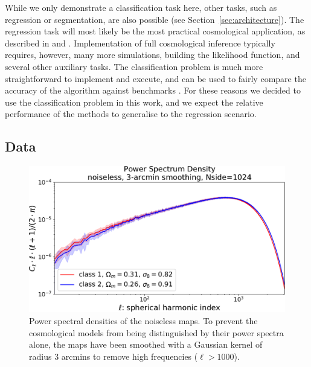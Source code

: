 \documentclass[final,twocolumn,3p,times,sort&compress]{elsarticle}
\newcommand{\secref}[1]{Section~\ref{sec:#1}}
\newcommand{\1}{\b{1}}              %
\newcommand{\0}{\b{0}}              %
\begin{document}
While we only demonstrate a classification task here, other tasks, such as regression or segmentation, are also possible (see \secref{architecture}).
The regression task will most likely be the most practical cosmological application, as described in \citep{gupta2018nongaussianinformation} and \citep{fluri2018deep}.
Implementation of full cosmological inference typically requires, however, many more simulations, building the likelihood function, and several other auxiliary tasks.
The classification problem is much more straightforward to implement and execute, and can be used to fairly compare the accuracy of the algorithm against benchmarks \citep{schmelze2017cosmologicalmodel}.
For these reasons we decided to use the classification problem in this work, and we expect the relative performance of the methods to generalise to the regression scenario.

\subsection{Data}
\label{sec:data}

\begin{figure}[t!]
	\centering
	\includegraphics[width=\linewidth]{psd_sigma3}
	\caption{Power spectral densities of the noiseless maps.
		To prevent the cosmological models from being distinguished by their power spectra alone, the maps have been smoothed with a Gaussian kernel of radius $3$ arcmins to remove high frequencies ($\ell>1000$).}
	\label{fig:psd_sigma3}
\end{figure}
\end{document}
